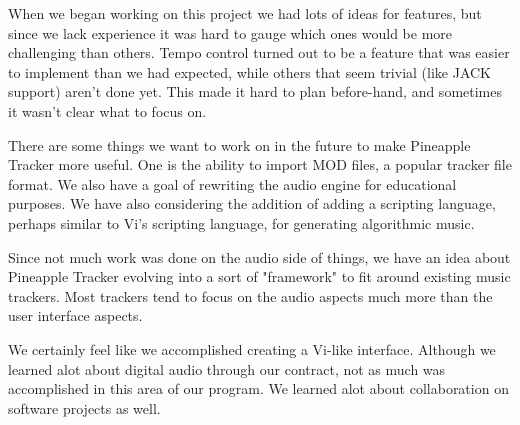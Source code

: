 \documentclass[12pt,letterpaper]{article}
\begin{document}
\par
When we began working on this project we had lots of ideas for features, but since we lack experience it was hard to gauge which ones would be more challenging than others. Tempo control turned out to be a feature that was easier to implement than we had expected, while others that seem trivial (like JACK support) aren't done yet. This made it hard to plan before-hand, and sometimes it wasn't clear what to focus on.

\par
There are some things we want to work on in the future to make Pineapple Tracker more useful. One is the ability to import MOD files, a popular tracker file format. We also have a goal of rewriting the audio engine for educational purposes. We have also considering the addition of adding a scripting language, perhaps similar to Vi's scripting language, for generating algorithmic music.

\par
Since not much work was done on the audio side of things, we have an idea about Pineapple Tracker evolving into a sort of "framework" to fit around existing music trackers. Most trackers tend to focus on the audio aspects much more than the user interface aspects.

\par
We certainly feel like we accomplished creating a Vi-like interface. Although we learned alot about digital audio through our contract, not as much was accomplished in this area of our program. We learned alot about collaboration on software projects as well.
\end{document}
